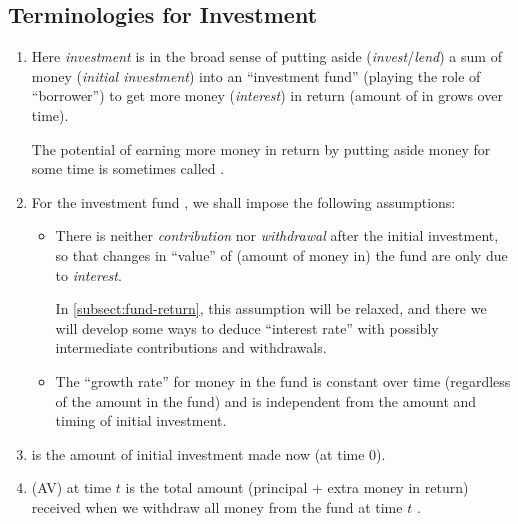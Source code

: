 \subsection{Terminologies for Investment}
\begin{enumerate}
\item Here \emph{investment} is in the broad sense of putting aside
(\emph{invest}/\emph{lend}) a sum of money  (\emph{initial
investment}) into an ``investment fund''  (playing the role
of ``borrower'') to get more money  (\emph{interest}) in
return (amount of  in  grows over time).

\begin{note}
The potential of earning more money in return by putting aside money for some
time is sometimes called .
\end{note}

\item For the investment fund , we shall impose the following assumptions:
\begin{itemize}
\item There is neither \emph{contribution} nor \emph{withdrawal} after the
initial investment, so that changes in ``value'' of (amount of money in) the
fund  are only due to \emph{interest}. \begin{note}
In \cref{subsect:fund-return}, this assumption will be relaxed, and there
we will develop some ways to deduce ``interest rate'' with possibly
intermediate contributions and withdrawals.
\end{note}
\item The ``growth rate'' for money in the fund  is constant
over time (regardless of the amount in the fund) and is independent from the
amount and timing of initial investment.
\end{itemize}

\item {} is the amount of initial investment made now (at time 0).
\item {} (AV) at time \(t\) is the total amount
(principal + extra money in return) received when we withdraw all money from
the fund  at time \(t\) .



\end{enumerate}
